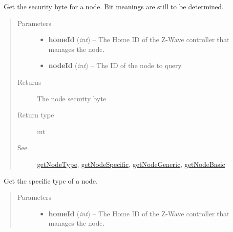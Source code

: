 \documentclass[letterpaper,10pt,english]{sphinxmanual}
\begin{document}
\begin{fulllineitems}
\begin{fulllineitems}
\end{fulllineitems}


\begin{fulllineitems}
\label{libopenzwave:libopenzwave.PyManager.getNodeSecurity}~\label{libopenzwave:getnodesecurity}
Get the security byte for a node.  Bit meanings are still to be determined.
\begin{quote}\begin{description}
\item[{Parameters}] \leavevmode\begin{itemize}
\item {} 
\textbf{homeId} (\emph{int}) -- The Home ID of the Z-Wave controller that manages the node.

\item {} 
\textbf{nodeId} (\emph{int}) -- The ID of the node to query.

\end{itemize}

\item[{Returns}] \leavevmode
The node security byte

\item[{Return type}] \leavevmode
int

\item[{See}] \leavevmode
{\hyperref[libopenzwave:getnodetype]{getNodeType}}, {\hyperref[libopenzwave:getnodespecific]{getNodeSpecific}}, {\hyperref[libopenzwave:getnodegeneric]{getNodeGeneric}}, {\hyperref[libopenzwave:getnodebasic]{getNodeBasic}}

\end{description}\end{quote}

\end{fulllineitems}


\begin{fulllineitems}
\label{libopenzwave:libopenzwave.PyManager.getNodeSpecific}~\label{libopenzwave:getnodespecific}
Get the specific type of a node.
\begin{quote}\begin{description}
\item[{Parameters}] \leavevmode\begin{itemize}
\item {} 
\textbf{homeId} (\emph{int}) -- The Home ID of the Z-Wave controller that manages the node.


\end{itemize}
\end{description}
\end{quote}
\end{fulllineitems}
\end{fulllineitems}
\end{document}
